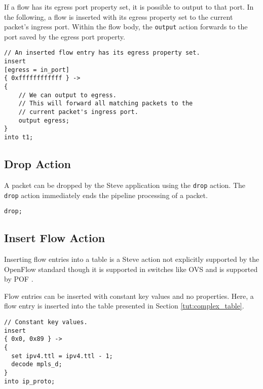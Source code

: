 If a flow has its egress port property set, it is possible to output to that
port. In the following, a flow is inserted with its egress property set to the
current packet's ingress port. Within the flow body, the \texttt{output} action forwards
to the port saved by the egress port property.

\begin{codepage}
\begin{lstlisting}
// An inserted flow entry has its egress property set.
insert
[egress = in_port]
{ 0xffffffffffff } ->
{
	// We can output to egress.
	// This will forward all matching packets to the
	// current packet's ingress port.
	output egress;
}
into t1;
\end{lstlisting}
\end{codepage}

\subsection{Drop Action} \label{tut:drop_action}

A packet can be dropped by the Steve application using the \texttt{drop} action.
The \texttt{drop} action immediately ends the pipeline processing of a packet.

\begin{codepage}
\begin{lstlisting}
drop;
\end{lstlisting}
\end{codepage}

\subsection{Insert Flow Action} \label{tut:insert_flow_action}

Inserting flow entries into a table is a Steve action not explicitly supported
by the OpenFlow standard \cite{openflow_spec} though it is supported in
switches like OVS \cite{ovs_man_page} and is supported by POF \cite{pof, pof_fis, pof_impl}.

Flow entries can be inserted with constant key values and no properties. Here,
a flow entry is inserted into the table presented in Section
\ref{tut:complex_table}.

\begin{codepage}
\begin{lstlisting}
// Constant key values.
insert
{ 0x0, 0x89 } ->
{
  set ipv4.ttl = ipv4.ttl - 1;
  decode mpls_d;
}
into ip_proto;
\end{lstlisting}
\end{codepage}

